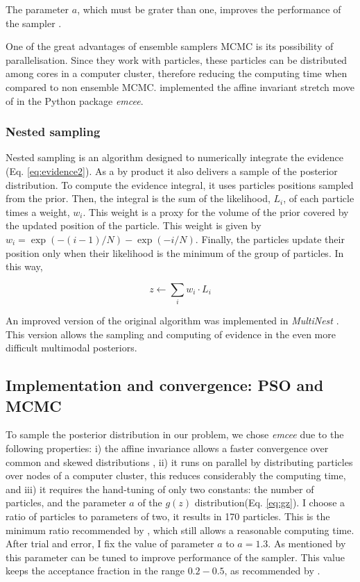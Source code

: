 The parameter $a$, which must be grater than one, improves the performance of the sampler \citep{Goodman2010}.

One of the great advantages of ensemble samplers MCMC is its possibility of parallelisation. Since they work with particles, these particles can be distributed among cores in a computer cluster, therefore reducing the computing time when compared to non ensemble MCMC. \citet{Foreman2013} implemented the affine invariant stretch move of \citet{Goodman2010} in the Python package \emph{emcee}. 
\subsubsection{Nested sampling}
\label{sect:NestedSampling}
Nested sampling \citep{Skilling2004,Skilling2006} is an algorithm designed to numerically integrate the evidence (Eq. \ref{eq:evidence2}). As a by product it also delivers a sample of the posterior distribution. To compute the evidence integral,  it uses particles positions sampled from the prior. Then, the integral is the sum of the likelihood, $L_i$, of each particle times a weight, $w_i$. This weight is a proxy for the volume of the prior covered by the updated position of the particle. This weight is given by $w_i = \exp(-(i-1)/N) - \exp(-i/N)$. Finally, the particles update their position only when their likelihood is the minimum of the group of particles. In this way,

\begin{equation}
z \leftarrow \sum_i w_i\cdot L_i
\end{equation}

An improved version of the original algorithm was implemented in \emph{MultiNest} \citep{Feroz2009}. This version allows the sampling and computing of evidence in the even more difficult multimodal posteriors. 

\subsection{Implementation and convergence: PSO and MCMC}
To sample the posterior distribution in our problem, we chose \emph{emcee} due to the following properties: i) the affine invariance allows a faster convergence over common and skewed distributions \cite[see][for details]{Goodman2010,Foreman2013}, ii) it runs on parallel by distributing particles over nodes of a computer cluster, this reduces considerably the computing time, and iii) it requires the hand-tuning of only two constants: the number of particles, and the parameter $a$ of the $g(z)$ distribution(Eq. \ref{eq:gz}). I choose a ratio of particles to parameters of two, it results in 170 particles. This is the minimum ratio recommended by \citet{Foreman2013}, which still allows a reasonable computing time. After trial and error, I fix the value of parameter $a$ to $a=1.3$. As mentioned by \citet{Goodman2010} this parameter can be tuned to improve performance of the sampler. This value keeps the acceptance fraction in the range $0.2-0.5$, as recommended by \citet{Foreman2013}.

